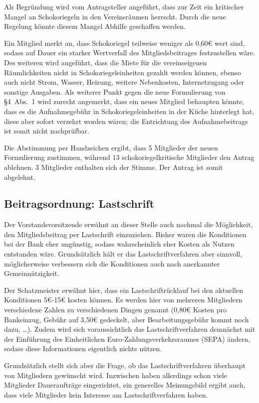 \documentclass[a4paper,12pt]{scrartcl}
\begin{document}
Als Begründung wird vom Antragsteller angeführt, dass zur Zeit ein kritischer
Mangel an Schokoriegeln in den Vereinsräumen herrscht. Durch die neue Regelung
könnte diesem Mangel Abhilfe geschaffen werden.

Ein Mitglied merkt an, dass Schokoriegel teilweise weniger als 0,60€ wert sind,
sodass auf Dauer ein starker Wertverfall des Mitgliedsbeitrages festzustellen
wäre. Des weiteren wird angeführt, dass die Miete für die vereinseigenen
Räumlichkeiten nicht in Schokoriegeleinheiten gezahlt werden können, ebenso auch
nicht Strom, Wasser, Heizung, weitere Nebenkosten, Internetzugang oder sonstige
Ausgaben. Als weiterer Punkt gegen die neue Formulierung von §4~Abs.~1 wird
zurecht angemerkt, dass ein neues Mitglied behaupten könnte, dass es die
Aufnahmegebühr in Schokoriegeleinheiten in der Küche hinterlegt hat, diese aber
sofort verzehrt worden wären; die Entrichtung des Aufnahmebeitrags ist somit
nicht nachprüfbar.

Die Abstimmung per Handzeichen ergibt, dass 5 Mitglieder der neuen Formulierung
zustimmen, während 13 schokoriegelkritische Mitglieder den Antrag ablehnen. 3
Mitglieder enthalten sich der Stimme. Der Antrag ist somit abgelehnt.

\subsection{Beitragsordnung: Lastschrift}
Der Vorstandsvorsitzende erwähnt an dieser Stelle auch nochmal die Möglichkeit,
den Mitgliedsbeitrag per Lastschrift einzuziehen. Bisher waren die Konditionen
bei der Bank eher ungünstig, sodass wahrscheinlich eher Kosten als Nutzen
entstanden wäre. Grundsätzlich hält er das Lastschriftverfahren aber sinnvoll,
möglicherweise verbessern sich die Konditionen auch nach anerkannter
Gemeinnützigkeit.

Der Schatzmeister erwähnt hier, dass ein Lastschriftrücklauf bei den aktuellen
Konditionen 5€-15€ kosten können. Es werden hier von mehreren Mitgliedern
verschiedene Zahlen zu verschiedenen Dingen genannt (0{,}80€ Kosten pro
Bankeinzug, Gebühr auf 3{,}50€ gedeckelt, aber Bearbeitungsgebühr kommt noch
dazu, \ldots). Zudem wird sich voraussichtlich das Lastschriftverfahren
demnächst mit der Einführung des Einheitlichen Euro-Zahlungsverkehrsraumes
(SEPA) ändern, sodass diese Informationen eigentlich nichts nützen.

Grundsätzlich stellt sich aber die Frage, ob das Lastschriftverfahren überhaupt
von Mitgliedern gewünscht wird. Inzwischen haben allerdings schon viele
Mitglieder Daueraufträge eingerichtet, ein generelles Meinungsbild ergibt auch,
dass viele Mitglieder kein Interesse am Lastschriftverfahren haben.
\end{document}
